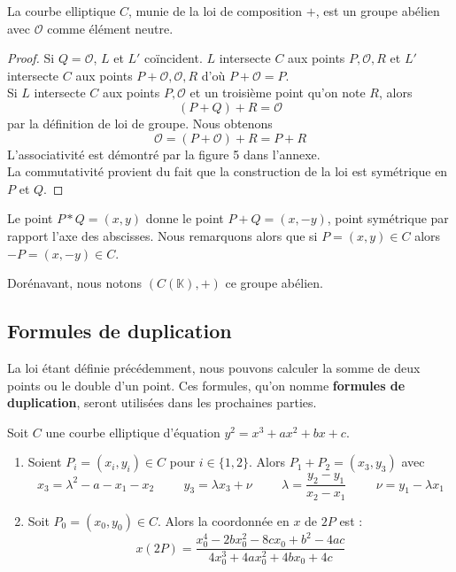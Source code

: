 \documentclass[a4paper]{article}
\begin{document}
\begin{prop}
La courbe elliptique $C$, munie de la loi de composition $+$, est un groupe abélien avec $\mathcal{O}$ comme élément neutre.
\end{prop}
\begin{proof} 

Si $Q=\mathcal{O}$, $L$ et $L'$ coïncident. $L$ intersecte $C$ aux points $P,\mathcal{O},R$ et $L'$ intersecte $C$ aux points $P+\mathcal{O},\mathcal{O},R$ d'où $P+\mathcal{O}=P$. \\ 
Si $L$ intersecte $C$ aux points $P,\mathcal{O}$ et un troisième point qu'on note $R$, alors
\begin{equation*}
(P+Q)+R=\mathcal{O}
\end{equation*}
par la définition de loi de groupe.
Nous obtenons 
\begin{equation*}
\mathcal{O}=(P+\mathcal{O})+R=P+R
\end{equation*}
L'associativité est démontré par la figure 5 dans l'annexe. \\
La commutativité provient du fait que la construction de la loi est symétrique en $P$ et $Q$.
\end{proof}
\begin{rem}
\noindent 
Le point $P*Q=(x,y)$ donne le point $P+Q=(x,-y)$, point symétrique par rapport l'axe des abscisses.
Nous remarquons alors que si $P=(x,y) \in C$ alors $-P=(x,-y) \in C$.
\end{rem}
\noindent Dorénavant, nous notons $(C(\mathbb{K}),+)$ ce groupe abélien.


\subsection{Formules de duplication}
\noindent La loi étant définie précédemment, nous pouvons calculer la somme de deux points ou le double d'un point. Ces formules, qu'on nomme \textbf{formules de duplication}, seront utilisées dans les prochaines parties.


\begin{prop} 
 Soit $C$ une courbe elliptique d'équation $ y^2=x^3+ax^2+bx+c$.
\begin{enumerate}
\item Soient $P_{i}=(x_{i},y_{i}) \in C$ pour $i \in \{1,2\}$.
Alors $P_{1}+P_{2}=(x_{3},y_{3})$ avec 
\begin{equation*}
x_{3}=\lambda^2-a-x_{1}-x_{2} \hspace{1cm} y_{3}=\lambda x_{3}+\nu
\hspace{1cm}
\lambda=\frac{y_{2}-y_{1}}{x_{2}-x_{1}} \hspace{1cm} \nu=y_{1}-\lambda x_{1}
\end{equation*}
\item Soit $P_{0}=(x_{0},y_{0}) \in C$. Alors la coordonnée en $x$ de $2P$ est :
\begin{equation*}
x(2P)=\frac{x_{0}^4-2bx_{0}^2-8cx_{0}+b^2-4ac}{4x_{0}^3+4ax_{0}^2+4bx_{0}+4c}
\end{equation*}
\end{enumerate}
\end{prop}
\end{document}
